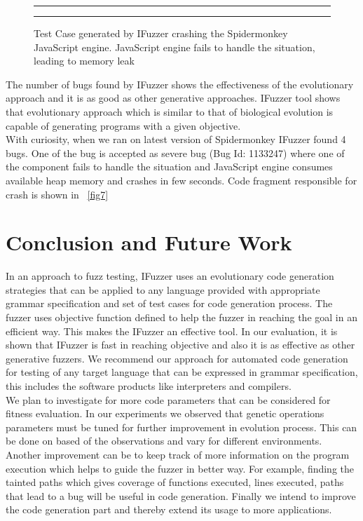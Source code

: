 \documentclass{acm_proc_article-sp}
\begin{document}
\begin{figure}[h]
\centering
\rule{9cm}{0.5pt}
\rule{9cm}{0.5pt}
\caption {Test Case generated by IFuzzer crashing the Spidermonkey JavaScript engine. JavaScript engine fails to handle the situation, leading to memory leak }
\label{fig7}
\end{figure}

\indent The number of bugs found by IFuzzer shows the effectiveness of the evolutionary approach and it is as good as other generative approaches. 
IFuzzer tool shows that evolutionary approach which is similar to that of biological evolution is capable of generating programs with a given objective.\\
\indent With curiosity, when we ran on latest version of Spidermonkey IFuzzer found  4 bugs. One of the bug is accepted as severe bug (Bug Id: 1133247) \cite{Misc01} where one of the component fails to handle the situation and JavaScript engine consumes available heap memory and crashes in few seconds. Code fragment responsible for crash is shown in ~\autoref{fig7}

\section{Conclusion and Future Work} \label{conclusion}
In an approach to fuzz testing, IFuzzer uses an evolutionary code generation strategies that can be applied to any language provided with appropriate grammar specification and set of test cases for code generation process. The fuzzer uses objective function defined to help the fuzzer in reaching the goal in an efficient way. This makes the IFuzzer an effective tool. In our evaluation, it is shown that IFuzzer is fast in reaching objective and also it is as effective as other generative fuzzers. We recommend our approach for automated code generation for testing of any target language that can be expressed in grammar specification, this includes the software products like interpreters and compilers.\\
\indent We plan to investigate for more code parameters that can be considered for fitness evaluation. In our experiments we observed that genetic operations parameters must be tuned for further improvement in evolution process. This can be done on based of the observations and vary for different environments. Another improvement can be to keep track of more information on the program execution which helps to guide the fuzzer in better way. For example,  finding the tainted paths which gives coverage of functions executed, lines executed, paths that lead to a bug will be useful in code generation. Finally we intend to improve the code generation part and thereby extend its usage to more applications.
\end{document}
